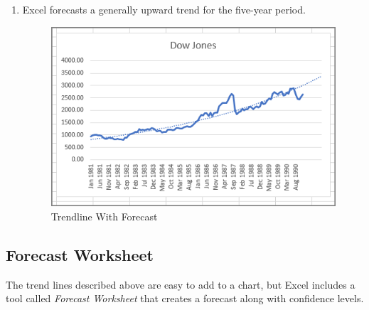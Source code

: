 \begin{enumbox}
\begin{enumerate}
		\item Excel forecasts a generally upward trend for the five-year period.
	
		\begin{figure}[H]
			\centering
			\includegraphics[width=\maxwidth{.95\linewidth}]{gfx/ch08_fig10}
			\caption{Trendline With Forecast}
			\label{08:fig10}
		\end{figure}
	
	\end{enumerate}
\end{enumbox}

\subsection{Forecast Worksheet}

The trend lines described above are easy to add to a chart, but Excel includes a tool called \textit{Forecast Worksheet} that creates a forecast along with confidence levels.

